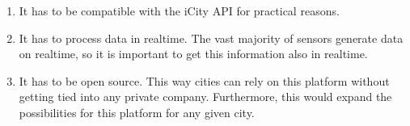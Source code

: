 \begin{enumerate}
  \itemsep0em
  \item It has to be compatible with the iCity \ac{API} for practical reasons.
  \item It has to process data in realtime. The vast majority of sensors
generate data on realtime, so it is important to get this information also in
realtime.
  \item It has to be open source. This way cities can rely on this platform
without getting tied into any private company. Furthermore, this would expand
the possibilities for this platform for any given city.
\end{enumerate}
